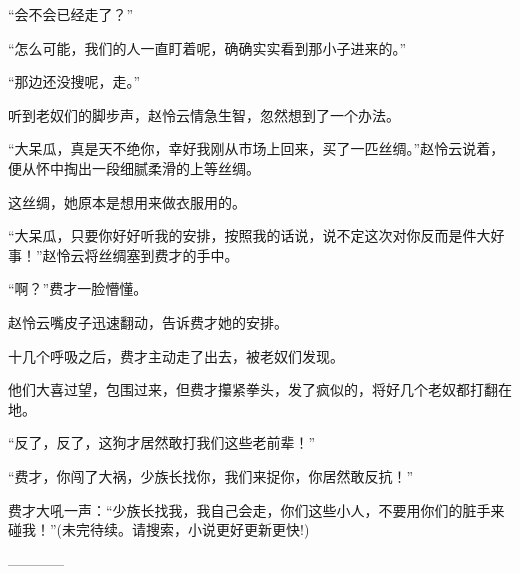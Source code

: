 \begin{this_body}
“会不会已经走了？”

“怎么可能，我们的人一直盯着呢，确确实实看到那小子进来的。”

“那边还没搜呢，走。”

听到老奴们的脚步声，赵怜云情急生智，忽然想到了一个办法。

“大呆瓜，真是天不绝你，幸好我刚从市场上回来，买了一匹丝绸。”赵怜云说着，便从怀中掏出一段细腻柔滑的上等丝绸。

这丝绸，她原本是想用来做衣服用的。

“大呆瓜，只要你好好听我的安排，按照我的话说，说不定这次对你反而是件大好事！”赵怜云将丝绸塞到费才的手中。

“啊？”费才一脸懵懂。

赵怜云嘴皮子迅速翻动，告诉费才她的安排。

十几个呼吸之后，费才主动走了出去，被老奴们发现。

他们大喜过望，包围过来，但费才攥紧拳头，发了疯似的，将好几个老奴都打翻在地。

“反了，反了，这狗才居然敢打我们这些老前辈！”

“费才，你闯了大祸，少族长找你，我们来捉你，你居然敢反抗！”

费才大吼一声：“少族长找我，我自己会走，你们这些小人，不要用你们的脏手来碰我！”(未完待续。请搜索，小说更好更新更快!)

------------

\end{this_body}

